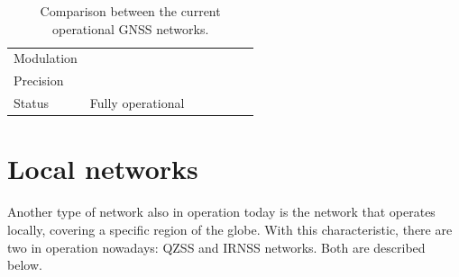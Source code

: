 \begin{table}[!h]
\begin{tabular}{lcccccc}
        Modulation                       &                   &                              &                      &                &         &  \\
        Precision                        &                   &                              &                      &                &         &  \\
        Status                           & Fully operational &                              &                      &                &         &  \\
        \bottomrule[1.5pt]
    \end{tabular}
    \caption{Comparison between the current operational GNSS networks.}
    \label{tab:networks-comparison}
\end{table}


\section{Local networks}

Another type of network also in operation today is the network that operates locally, covering a specific region of the globe. With this characteristic, there are two in operation nowadays: QZSS and IRNSS networks. Both are described below.

